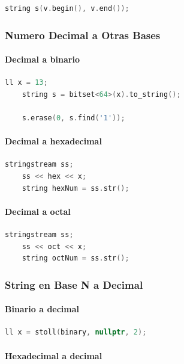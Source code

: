 \begin{lstlisting}[language=C++]
	string s(v.begin(), v.end());
\end{lstlisting}

\subsubsection{Numero Decimal a Otras Bases}

\paragraph{Decimal a binario}

\begin{lstlisting}[language=C++]
	ll x = 13;
	string s = bitset<64>(x).to_string();

	s.erase(0, s.find('1'));
\end{lstlisting}

\paragraph{Decimal a hexadecimal}

\begin{lstlisting}[language=C++]
	stringstream ss;
	ss << hex << x;
	string hexNum = ss.str();
\end{lstlisting}

\paragraph{Decimal a octal}

\begin{lstlisting}[language=C++]
	stringstream ss;
	ss << oct << x;
	string octNum = ss.str();
\end{lstlisting}

\subsubsection{String en Base N a Decimal}

\paragraph{Binario a decimal}

\begin{lstlisting}[language=C++]
	ll x = stoll(binary, nullptr, 2);
\end{lstlisting}

\paragraph{Hexadecimal a decimal}

